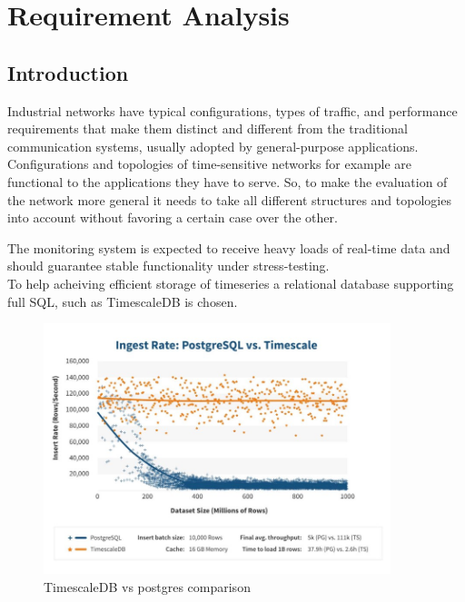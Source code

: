 \cleardoublepage
\chapter{Requirement Analysis}\label{sec:reqs}\minitoc\vspace{.5cm}

\section{Introduction}

Industrial networks have typical configurations, types of traffic, and performance requirements that make them distinct and different from
the traditional communication systems, usually adopted by general-purpose applications.
Configurations and topologies of time-sensitive networks for example are functional to the applications they have to serve.\cite{8715451}
So, to make the evaluation of the network more general it needs to take all different structures and topologies into account without favoring a certain case over the other.

The monitoring system is expected to receive heavy loads of real-time data and should guarantee stable functionality under stress-testing.\\
To help acheiving efficient storage of timeseries a relational database supporting full SQL, such as TimescaleDB is chosen.\\

\begin{figure}[H]
    \centering
    \includegraphics[width=0.9\textwidth]{resources/images/timescaledb_postgres.png}
    \caption{TimescaleDB vs postgres comparison \cite{timescal85}}
    \label{fig:timescaledb-postgres}
\end{figure}

